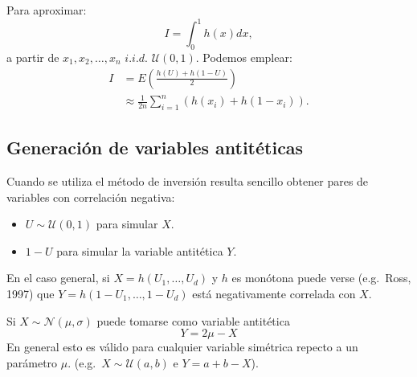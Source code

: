 \documentclass[
]{book}
\theoremstyle{break}
\theoremstyle{nonumberplain}
\begin{document}
Para aproximar:
\[I=\int_{0}^{1}h\left(  x\right) dx,\]
a partir de \(x_{1},x_{2},\ldots,x_{n}\) \(i.i.d.\)
\(\mathcal{U}\left(0,1\right)\).
Podemos emplear:
\[\begin{aligned}
    I  & =E\left(  \frac{h\left(  U\right)  +h\left(  1-U\right)  }{2}\right) \\
    & \approx \frac{1}{2n}\sum \limits_{i=1}^{n}\left(  h\left(  x_{i}\right)
    +h\left(  1-x_{i}\right)  \right).
\end{aligned}\]

\hypertarget{generaciuxf3n-de-variables-antituxe9ticas}{%
\subsection{Generación de variables antitéticas}\label{generaciuxf3n-de-variables-antituxe9ticas}}

Cuando se utiliza el método de inversión resulta sencillo obtener
pares de variables con correlación negativa:

\begin{itemize}
\item
  \(U\sim \mathcal{U}\left( 0,1\right)\) para simular \(X\).
\item
  \(1-U\) para simular la variable antitética \(Y\).
\end{itemize}

En el caso general, si \(X=h\left( U_{1},\ldots,U_{d}\right)\) y
\(h\) es monótona puede verse (e.g.~Ross, 1997) que
\(Y=h\left( 1-U_{1},\ldots,1-U_{d}\right)\) está negativamente
correlada con \(X\).

Si \(X\sim \mathcal{N}(\mu,\sigma)\) puede tomarse como variable
antitética \[Y=2\mu-X\]
En general esto es válido para cualquier variable
simétrica repecto a un parámetro \(\mu\).
(e.g.~\(X\sim \mathcal{U}(a,b)\) e \(Y=a+b-X\)).
\end{document}
